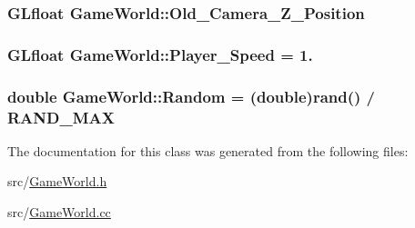 \subsubsection[{Old\+\_\+\+Camera\+\_\+\+Z\+\_\+\+Position}]{\setlength{\rightskip}{0pt plus 5cm}G\+Lfloat Game\+World\+::\+Old\+\_\+\+Camera\+\_\+\+Z\+\_\+\+Position}\label{class_game_world_acf69fc81410f4bb31d03b7551eb0bced}
\hypertarget{class_game_world_ae8ab2ac372729cec44ea316f6bdf45ca}{}
\subsubsection[{Player\+\_\+\+Speed}]{\setlength{\rightskip}{0pt plus 5cm}G\+Lfloat Game\+World\+::\+Player\+\_\+\+Speed = 1.}\label{class_game_world_ae8ab2ac372729cec44ea316f6bdf45ca}
\hypertarget{class_game_world_a56652cc9880b3ba1be61395066c863c3}{}
\subsubsection[{Random}]{\setlength{\rightskip}{0pt plus 5cm}double Game\+World\+::\+Random = (double)rand() / R\+A\+N\+D\+\_\+\+M\+A\+X}\label{class_game_world_a56652cc9880b3ba1be61395066c863c3}


The documentation for this class was generated from the following files\+:\begin{DoxyCompactItemize}
\item 
src/\hyperlink{_game_world_8h}{Game\+World.\+h}\item 
src/\hyperlink{_game_world_8cc}{Game\+World.\+cc}\end{DoxyCompactItemize}
